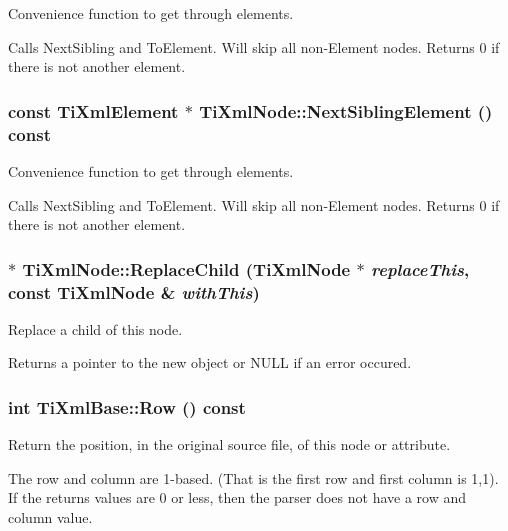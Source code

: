Convenience function to get through elements. 

Calls Next\-Sibling and To\-Element. Will skip all non-Element nodes. Returns 0 if there is not another element.
\subsubsection{\setlength{\rightskip}{0pt plus 5cm}const {\bf Ti\-Xml\-Element} $\ast$ Ti\-Xml\-Node::Next\-Sibling\-Element () const\hspace{0.3cm}{\tt  [inherited]}}\label{classTiXmlNode_TiXmlUnknowna50}


Convenience function to get through elements. 

Calls Next\-Sibling and To\-Element. Will skip all non-Element nodes. Returns 0 if there is not another element.
\subsubsection{ $\ast$ Ti\-Xml\-Node::Replace\-Child ({\bf Ti\-Xml\-Node} $\ast$ {\em replace\-This}, const {\bf Ti\-Xml\-Node} \& {\em with\-This})\hspace{0.3cm}{\tt  [inherited]}}\label{classTiXmlNode_TiXmlUnknowna36}


Replace a child of this node. 

Returns a pointer to the new object or NULL if an error occured.
\subsubsection{\setlength{\rightskip}{0pt plus 5cm}int Ti\-Xml\-Base::Row () const\hspace{0.3cm}{\tt  [inline, inherited]}}\label{classTiXmlBase_TiXmlUnknowna78}


Return the position, in the original source file, of this node or attribute. 

The row and column are 1-based. (That is the first row and first column is 1,1). If the returns values are 0 or less, then the parser does not have a row and column value.

